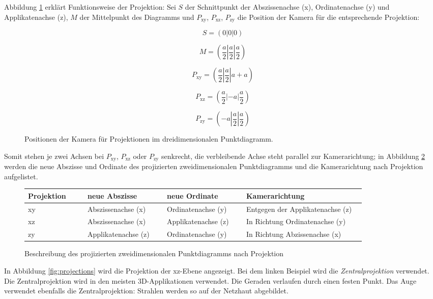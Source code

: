 Abbildung \ref{fig:3dmath} erklärt Funktionsweise der Projektion: Sei $S$ der Schnittpunkt der Abszissenachse (x), Ordinatenachse (y) und Applikatenachse (z), $M$ der Mittelpunkt des Diagramms und $P_{\text{xy}}$, $P_{\text{xz}}$, $P_{\text{zy}}$ die Position der Kamera für die entsprechende Projektion:

\begin{figure}[H]
$$S = (0|0|0)$$

$$M = (\frac{a}{2} | \frac{a}{2} | \frac{a}{2})$$

$$P_{\text{xy}} = (\frac{a}{2} | \frac{a}{2}| a + a)$$

$$P_{\text{xz}} = (\frac{a}{2} | -a | \frac{a}{2})$$

$$P_{\text{zy}} = (-a | \frac{a}{2}| \frac{a}{2})$$

\caption{Positionen der Kamera für Projektionen im dreidimensionalen Punktdiagramm.}
\label{fig:3dmath}
\end{figure}

Somit stehen je zwei Achsen bei $P_{\text{xy}}$, $P_{\text{xz}}$ oder $P_{\text{zy}}$ senkrecht, die verbleibende Achse steht parallel zur Kamerarichtung; in Abbildung \ref{fig:3dtable} werden die neue Abszisse und Ordinate des projizierten zweidimensionalen Punktdiagramms und die Kamerarichtung nach Projektion aufgelistet.

\begin{figure}[H]
	\centering
	\begin{tabular}{ | m{0.15\linewidth} | m{0.2\linewidth} |m{0.2\linewidth} | m{0.3\linewidth} |}
		\hline
		\textbf{Projektion} & \textbf{neue Abszisse} & \textbf{neue Ordinate} & \textbf{Kamerarichtung}\\ \hline
		xy & Abszissenachse (x) & Ordinatenachse (y) & Entgegen der Applikatenachse (z) \\ \hline
		xz & Abszissenachse (x) & Applikatenachse (z) & In Richtung Ordinatenachse (y)\\ \hline
		zy & Applikatenachse (z) & Ordinatenachse (y) & In Richtung Abzissenachse (x) \\ \hline
	\end{tabular}
	\caption{Beschreibung des projizierten zweidimensionalen Punktdiagramms nach Projektion}
	\label{fig:3dtable}
\end{figure}

In Abbildung \ref{fig:projections} wird die Projektion der xz-Ebene angezeigt. Bei dem linken Beispiel wird die \textit{Zentralprojektion} verwendet. Die Zentralprojektion wird in den meisten 3D-Applikationen verwendet. Die Geraden verlaufen durch einen festen Punkt. Das Auge verwendet ebenfalls die Zentralprojektion: Strahlen werden so auf der Netzhaut abgebildet.

